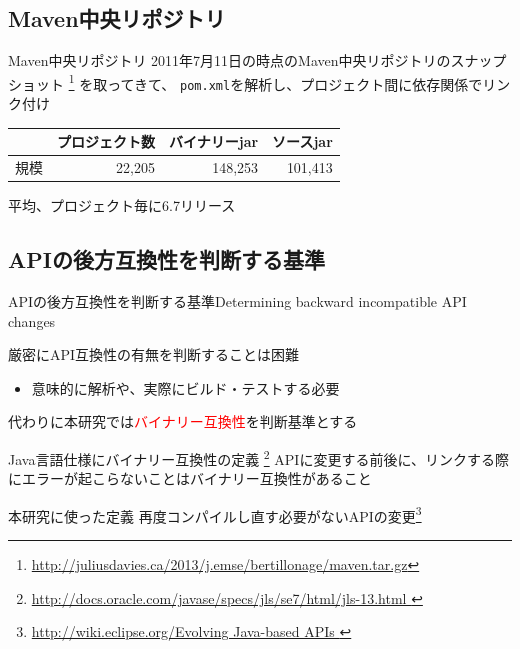\subsection{Maven中央リポジトリ}
\begin{frame}{Maven中央リポジトリ}
2011年7月11日の時点のMaven中央リポジトリのスナップショット
\footnote{\url{http://juliusdavies.ca/2013/j.emse/bertillonage/maven.tar.gz}}
を取ってきて、
\texttt{pom.xml}を解析し、プロジェクト間に依存関係でリンク付け

\vspace{1em}

\begin{tabular}{l|r|r|r}
& プロジェクト数 & バイナリーjar & ソースjar \\
\hline
規模 & 22,205 & 148,253 & 101,413　\\
\end{tabular}

\vspace{1em}

平均、プロジェクト毎に6.7リリース
\end{frame}

\subsection{APIの後方互換性を判断する基準}
\begin{frame}{APIの後方互換性を判断する基準}{Determining backward incompatible API changes
}
{\small

厳密にAPI互換性の有無を判断することは困難
  \begin{itemize}
  \item 意味的に解析や、実際にビルド・テストする必要
  \end{itemize}
\pause

代わりに本研究では\textcolor{red}{バイナリー互換性}を判断基準とする

\begin{block}{Java言語仕様にバイナリー互換性の定義
\footnote{\url{http://docs.oracle.com/javase/specs/jls/se7/html/jls-13.html
}}}
APIに変更する前後に、リンクする際にエラーが起こらないことはバイナリー互換性があること
\end{block}

\begin{block}{本研究に使った定義}
再度コンパイルし直す必要がないAPIの変更\footnote{\url{http://wiki.eclipse.org/Evolving Java-based APIs
}}
\end{block}
}

\end{frame}

